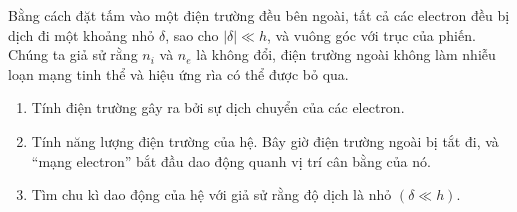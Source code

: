 \begin{vd}
\begin{center}
\begin{tikzpicture}[x=0.75pt,y=0.75pt,yscale=-1,xscale=1]
\end{tikzpicture}
\end{center}
Bằng cách đặt tấm vào một điện trường đều bên ngoài, tất cả các electron đều bị dịch đi một khoảng nhỏ $\delta$, sao cho $|\delta| \ll h$, và vuông góc với trục của phiến. Chúng ta giả sử rằng $n_i$ và $n_e$ là không đổi, điện trường ngoài không làm nhiễu loạn mạng tinh thể và hiệu ứng rìa có thể được bỏ qua.
\begin{enumerate}[1)]
   \item Tính điện trường gây ra bởi sự dịch chuyển của các electron.
    \item Tính năng lượng điện trường của hệ.
Bây giờ điện trường ngoài bị tắt đi, và “mạng electron” bắt đầu dao động quanh vị trí cân bằng của nó.
  \item Tìm chu kì dao động của hệ với giả sử rằng độ dịch là nhỏ $(\delta \ll h)$.
\end{enumerate}
  
\end{vd}

